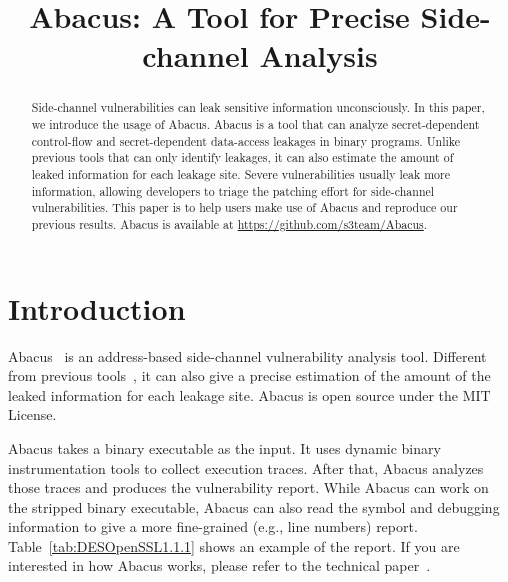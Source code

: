 \documentclass[10pt,conference]{IEEEtran}
\newcommand{\tool}{\textsf{Abacus}}
\begin{document}
\title{\tool{}: A Tool for Precise Side-channel Analysis}
\author{
}


\maketitle

\begin{abstract}
Side-channel vulnerabilities can leak sensitive information unconsciously. 
In this paper, we introduce the usage of Abacus. Abacus is a tool that can analyze secret-dependent control-flow and secret-dependent data-access leakages in binary programs. Unlike previous tools that can only identify leakages, it can also estimate the amount of leaked information for each leakage site. Severe vulnerabilities usually leak more information, allowing developers to triage the patching effort for side-channel vulnerabilities. This paper is to help users make use of Abacus and reproduce our previous
results. Abacus is available at \url{https://github.com/s3team/Abacus}.
\end{abstract}

\IEEEpeerreviewmaketitle
{}
\pagestyle{plain}
\section{Introduction}

\tool{}~\cite{bao2021abacus} is an address-based side-channel vulnerability analysis tool. Different from previous tools~\cite{203878,236338,182946}, it can also give a precise estimation of the amount of the leaked information for each leakage site. \tool{} is open source under the MIT License. 



\tool{} takes a binary executable as the input. It uses dynamic binary instrumentation tools to collect execution traces. After that, \tool{} analyzes those traces and produces the vulnerability report. While \tool{} can work on the stripped binary executable, \tool{} can also read the symbol and debugging information to give a more fine-grained (e.g., line numbers) report. Table~\ref{tab:DESOpenSSL1.1.1} shows an example of the report. If you are interested in how \tool{} works, please refer to the technical paper~\cite{bao2021abacus}.
\end{document}
